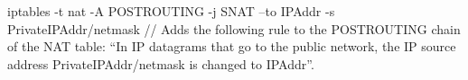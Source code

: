 iptables -t nat -A POSTROUTING -j SNAT --to IPAddr -s PrivateIPAddr/netmask //
Adds the following rule to the POSTROUTING chain of the NAT table: “In IP datagrams
that go to the public network, the IP source address PrivateIPAddr/netmask is
changed to IPAddr”.